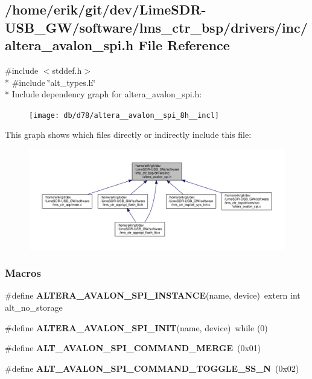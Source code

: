 \subsection{/home/erik/git/dev/\+Lime\+S\+D\+R-\/\+U\+S\+B\+\_\+\+G\+W/software/lms\+\_\+ctr\+\_\+bsp/drivers/inc/altera\+\_\+avalon\+\_\+spi.h File Reference}
\label{altera__avalon__spi_8h}
{\ttfamily \#include $<$stddef.\+h$>$}\\*
{\ttfamily \#include \char`\"{}alt\+\_\+types.\+h\char`\"{}}\\*
Include dependency graph for altera\+\_\+avalon\+\_\+spi.\+h\+:
\nopagebreak
\begin{figure}[H]
\begin{center}
\leavevmode
\texttt{[image: db/d78/altera\_\_avalon\_\_spi\_8h\_\_incl]}
\end{center}
\end{figure}
This graph shows which files directly or indirectly include this file\+:
\nopagebreak
\begin{figure}[H]
\begin{center}
\leavevmode
\includegraphics[width=350pt]{d8/dc7/altera__avalon__spi_8h__dep__incl}
\end{center}
\end{figure}
\subsubsection*{Macros}
\begin{DoxyCompactItemize}
\item 
\#define {\bf A\+L\+T\+E\+R\+A\+\_\+\+A\+V\+A\+L\+O\+N\+\_\+\+S\+P\+I\+\_\+\+I\+N\+S\+T\+A\+N\+CE}(name,  device)~extern int alt\+\_\+no\+\_\+storage
\item 
\#define {\bf A\+L\+T\+E\+R\+A\+\_\+\+A\+V\+A\+L\+O\+N\+\_\+\+S\+P\+I\+\_\+\+I\+N\+IT}(name,  device)~while (0)
\item 
\#define {\bf A\+L\+T\+\_\+\+A\+V\+A\+L\+O\+N\+\_\+\+S\+P\+I\+\_\+\+C\+O\+M\+M\+A\+N\+D\+\_\+\+M\+E\+R\+GE}~(0x01)
\item 
\#define {\bf A\+L\+T\+\_\+\+A\+V\+A\+L\+O\+N\+\_\+\+S\+P\+I\+\_\+\+C\+O\+M\+M\+A\+N\+D\+\_\+\+T\+O\+G\+G\+L\+E\+\_\+\+S\+S\+\_\+N}~(0x02)
\end{DoxyCompactItemize}
